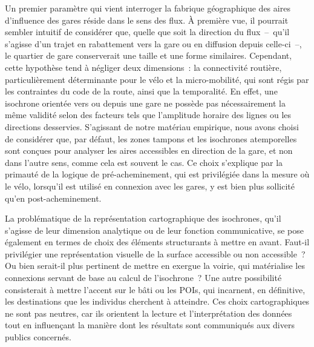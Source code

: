 \begin{refsegment}
Un premier paramètre qui vient interroger la fabrique géographique des aires d’influence des gares réside dans le sens des flux. À première vue, il pourrait sembler intuitif de considérer que, quelle que soit la direction du flux~–~qu’il s’agisse d'un trajet en rabattement vers la gare ou en diffusion depuis celle-ci~–, le quartier de gare conserverait une taille et une forme similaires. Cependant, cette hypothèse tend à négliger deux dimensions~: la connectivité routière, particulièrement déterminante pour le vélo et la micro-mobilité, qui sont régis par les contraintes du code de la route, ainsi que la temporalité. En effet, une isochrone orientée vers ou depuis une gare ne possède pas nécessairement la même validité selon des facteurs tels que l’amplitude horaire des lignes ou les directions desservies. S'agissant de notre matériau empirique, nous avons choisi de considérer que, par défaut, les zones tampons et les isochrones atemporelles sont conçues pour analyser les aires accessibles en direction de la gare, et non dans l’autre sens, comme cela est souvent le cas. Ce choix s'explique par la primauté de la logique de pré-acheminement, qui est privilégiée dans la mesure où le vélo, lorsqu'il est utilisé en connexion avec les gares, y est bien plus sollicité qu'en post-acheminement.%

La problématique de la représentation cartographique des isochrones, qu’il s’agisse de leur dimension analytique ou de leur fonction communicative, se pose également en termes de choix des éléments structurants à mettre en avant. Faut-il privilégier une représentation visuelle de la surface accessible ou non accessible~? Ou bien serait-il plus pertinent de mettre en exergue la voirie, qui matérialise les connexions servant de base au calcul de l’isochrone~? Une autre possibilité consisterait à mettre l'accent sur le bâti ou les \acrfull{POIs}, qui incarnent, en définitive, les destinations que les individus cherchent à atteindre. Ces choix cartographiques ne sont pas neutres, car ils orientent la lecture et l’interprétation des données tout en influençant la manière dont les résultats sont communiqués aux divers publics concernés.%


\end{refsegment}
